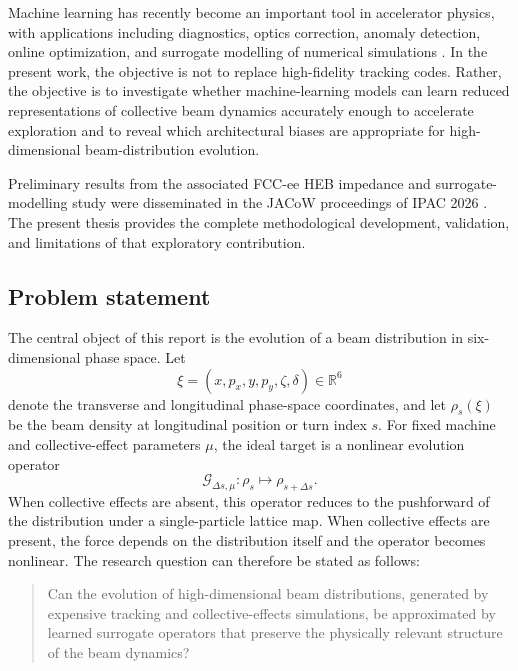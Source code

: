 Machine learning has recently become an important tool in accelerator physics, with applications including diagnostics, optics correction, anomaly detection, online optimization, and surrogate modelling of numerical simulations \cite{arpaia_machine_2021,roussel_bayesian_2024}. In the present work, the objective is not to replace high-fidelity tracking codes. Rather, the objective is to investigate whether machine-learning models can learn reduced representations of collective beam dynamics accurately enough to accelerate exploration and to reveal which architectural biases are appropriate for high-dimensional beam-distribution evolution.

Preliminary results from the associated FCC-ee HEB impedance and surrogate-modelling study were disseminated in the JACoW proceedings of IPAC 2026 \cite{my_paper}. The present thesis provides the complete methodological development, validation, and limitations of that exploratory contribution.

\subsection{Problem statement}
The central object of this report is the evolution of a beam distribution in six-dimensional phase space. Let
\begin{equation}
    \xi=(x,p_x,y,p_y,\zeta,\delta)\in\mathbb{R}^{6}
\end{equation}
denote the transverse and longitudinal phase-space coordinates, and let $\rho_s(\xi)$ be the beam density at longitudinal position or turn index $s$. For fixed machine and collective-effect parameters $\mu$, the ideal target is a nonlinear evolution operator
\begin{equation}
    \mathcal{G}_{\Delta s,\mu}: \rho_s \mapsto \rho_{s+\Delta s}.
    \label{eq:intro_operator_target}
\end{equation}
When collective effects are absent, this operator reduces to the pushforward of the distribution under a single-particle lattice map. When collective effects are present, the force depends on the distribution itself and the operator becomes nonlinear. The research question can therefore be stated as follows:

\begin{quote}
Can the evolution of high-dimensional beam distributions, generated by expensive tracking and collective-effects simulations, be approximated by learned surrogate operators that preserve the physically relevant structure of the beam dynamics?
\end{quote}


